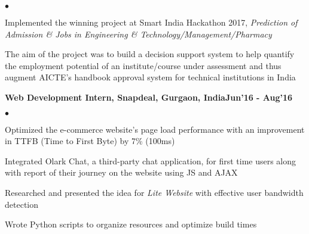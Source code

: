 \documentclass[margin,line]{res}
\newenvironment{list2}{
  \begin{list}{$\bullet$}{%
      \setlength{\itemsep}{0in}
      \setlength{\parsep}{0in} \setlength{\parskip}{0in}
      \setlength{\topsep}{0in} \setlength{\partopsep}{0in}
      \setlength{\leftmargin}{0.2in}}}{\end{list}}
\begin{document}
\begin{resume}
\begin{list2}
  \item Implemented the winning project at Smart India Hackathon 2017, {\it Prediction of Admission \& Jobs in Engineering \& Technology/Management/Pharmacy}
  \item The aim of the project was to build a decision support system to help quantify the employment
potential of an institute/course under assessment and thus augment AICTE’s handbook approval system for technical institutions in India
\end{list2}
{\bf Web Development Intern, Snapdeal, Gurgaon, India}\hfill {\bf Jun'16 - Aug'16}

\begin{list2}
  \item Optimized the e-commerce website's page load performance with an improvement in TTFB (Time to First Byte) by 7\% (100ms) 
  \item Integrated Olark Chat, a third-party chat application, for first time users along with report of their journey on the website using JS and AJAX
  \item Researched and presented the idea for {\it Lite Website} with effective user bandwidth detection 
  \item Wrote Python scripts to organize resources and optimize build times
\end{list2}



\end{resume}
\end{document}
